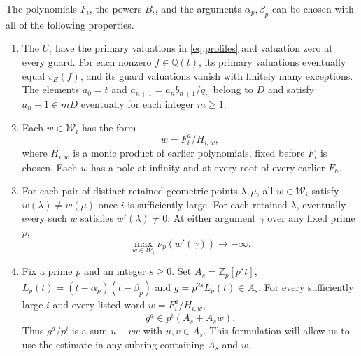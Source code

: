 \begin{proposition}
    \label{prop:construction}
    The polynomials $F_i$, the powers $B_i$, and the arguments $\alpha_p, \beta_p$ can be chosen with all of the following properties.
    \begin{enumerate}
        \item The $U_i$ have the primary valuations in \eqref{eq:profiles} and valuation zero at every guard.
        For each nonzero $f \in \mathbb{Q}(t)$, its primary valuations eventually equal $v_E(f)$, and its guard valuations vanish with finitely many exceptions.
        The elements $a_0 = t$ and $a_{n + 1} = a_n b_{n + 1} / q_n$ belong to $D$ and satisfy $a_n - 1 \in mD$ eventually for each integer $m \ge 1$.
        \item Each $w \in \mathcal{W}_i$ has the form
        \begin{equation}
            \label{eq:scheduled-word}
            w = F_i^{a} / H_{i, w},
        \end{equation}
        where $H_{i, w}$ is a monic product of earlier polynomials, fixed before $F_i$ is chosen.
        Each $w$ has a pole at infinity and at every root of every earlier $F_h$.
        \item For each pair of distinct retained geometric points $\lambda, \mu$, all $w \in \mathcal{W}_i$ satisfy $w(\lambda) \ne w(\mu)$ once $i$ is sufficiently large.
        For each retained $\lambda$, eventually every such $w$ satisfies $w'(\lambda) \ne 0$.
        At either argument $\gamma$ over any fixed prime $p$,
        \[
            \max_{w \in \mathcal{W}_i} \nu_p(w'(\gamma)) \longrightarrow -\infty.
        \]
        \item Fix a prime $p$ and an integer $s \ge 0$.
        Set $A_s = \mathbb{Z}_p[p^s t]$, $L_p(t) = (t - \alpha_p)(t - \beta_p)$ and $g = p^{2s} L_p(t) \in A_s$.
        For every sufficiently large $i$ and every listed word $w = F_i^a/H_{i, w}$,
        \begin{equation}
            \label{eq:transfer-module}
            g^a \in p^i (A_s + A_s w).
        \end{equation}
        Thus $g^a/p^i$ is a sum $u + v w$ with $u, v \in A_s$.
        This formulation will allow us to use the estimate in any subring containing $A_s$ and $w$.
    \end{enumerate}
\end{proposition}

